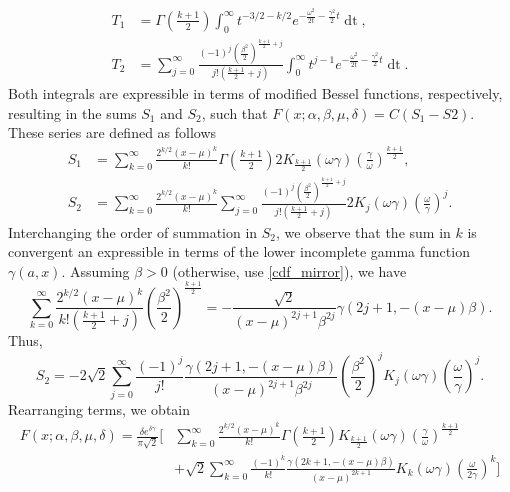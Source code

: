 \documentclass[10pt,a4paper,oneside]{article}
\numberwithin{equation}{section}
\begin{document}
\begin{align}
T_1 &= \Gamma\left(\frac{k+1}{2}\right)\int_0^{\infty}t^{-3/2-k/2} e^{-\frac{\omega^2}{2t} - \frac{\gamma^2}{2}t} \mathop{dt},\\
T_2 &= \sum_{j=0}^{\infty} \frac{(-1)^j \left(\frac{\beta^2}{2}\right)^{\frac{k+1}{2}+j}}{j! (\frac{k+1}{2}+ j)}\int_0^{\infty} t^{j-1} e^{-\frac{\omega^2}{2t} - \frac{\gamma^2}{2}t} \mathop{dt}.
\end{align}
Both integrals are expressible in terms of modified Bessel functions, respectively, resulting in the sums $S_1$ and $S_2$, such that $F(x;\alpha, \beta, \mu, \delta) = C (S_1 - S2)$. These series are defined as follows
\begin{align}
S_1 &= \sum_{k=0}^{\infty}\frac{2^{k/2}(x-\mu)^k}{k!} \Gamma\left(\frac{k+1}{2}\right)2 K_{\frac{k+1}{2}}(\omega \gamma) \left(\frac{\gamma}{\omega}\right)^{\frac{k+1}{2}},\\
S_2 &= \sum_{k=0}^{\infty}\frac{2^{k/2}(x-\mu)^k}{k!}\sum_{j=0}^{\infty}\frac{(-1)^j \left(\frac{\beta^2}{2}\right)^{\frac{k+1}{2}+j}}{j! (\frac{k+1}{2}+ j)} 2 K_j(\omega \gamma) \left(\frac{\omega}{\gamma}\right)^j.
\end{align}
Interchanging the order of summation in $S_2$, we observe that the sum in $k$ is convergent an expressible in terms of the lower incomplete gamma function $\gamma(a, x)$. Assuming $\beta > 0$ (otherwise, use \eqref{cdf_mirror}), we have
\begin{equation}
\sum_{k=0}^{\infty}\frac{2^{k/2}(x-\mu)^k}{k! (\frac{k+1}{2}+ j)} \left(\frac{\beta^2}{2}\right)^{\frac{k+1}{2}} = -\frac{\sqrt{2}}{(x-\mu)^{2j+1}\beta^{2j}} \gamma \left(2j + 1, -(x-\mu)\beta\right).
\end{equation}
Thus,
\begin{equation}
S_2 = -2\sqrt{2} \sum_{j=0}^{\infty} \frac{(-1)^j}{j!}\frac{\gamma \left(2j + 1, -(x-\mu)\beta\right)}{(x-\mu)^{2j+1}\beta^{2j}} \left(\frac{\beta^2}{2}\right)^j  K_j(\omega \gamma) \left(\frac{\omega}{\gamma}\right)^j.
\end{equation}
Rearranging terms, we obtain
\begin{align}\label{general_xmu_two_series}
F(x;\alpha, \beta, \mu, \delta) = \frac{\delta e^{\delta \gamma}}{\pi \sqrt{2}} \bigg[& \sum_{k=0}^{\infty}\frac{2^{k/2}(x-\mu)^k}{k!} \Gamma\left(\frac{k+1}{2}\right) K_{\frac{k+1}{2}}(\omega \gamma) \left(\frac{\gamma}{\omega}\right)^{\frac{k+1}{2}}\nonumber\\
& + \sqrt{2}\sum_{k=0}^{\infty} \frac{(-1)^k}{k!}\frac{\gamma \left(2k + 1, -(x-\mu)\beta\right)}{(x-\mu)^{2k+ 1}}  K_k(\omega \gamma) \left(\frac{\omega}{2\gamma}\right)^k \bigg]
\end{align}
\end{document}

